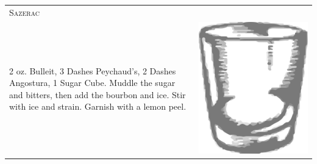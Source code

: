 \documentclass{article}
\begin{document}
\begin{tabular}{p{2in} p{0.5in}}
\multicolumn{2}{p{3in}}{\centering\Huge\textsc{Sazerac}} \\ 
  \vspace{-0.1in}2 oz. Bulleit, 3 Dashes Peychaud's, 2 Dashes Angostura, 1 Sugar Cube.  Muddle the sugar and bitters, then add the bourbon and ice. Stir with ice and strain. Garnish with a lemon peel. &
   \vspace{-0.1in} \includegraphics{rocks_glass.png}
\end{tabular}
\end{document}
